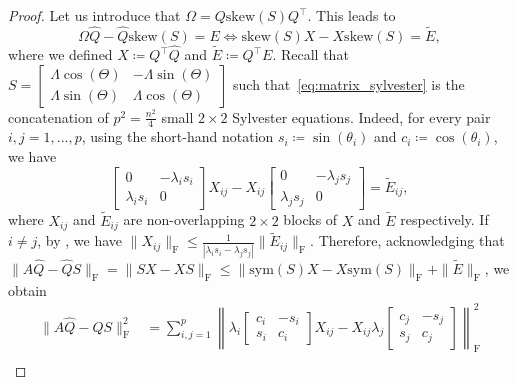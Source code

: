 \documentclass[10pt,twoside,dvipsnames]{siamart1116}
\numberwithin{algorithm}{section}
\numberwithin{equation}{section}
\begin{document}
\begin{proof}

Let us introduce that $\Omega=Q\mathrm{skew}(S)Q^\top$. This leads to
\begin{equation}\label{eq:matrix_sylvester}
	\Omega \widehat{Q} -\widehat{Q}\mathrm{skew}(S)=E\iff \mathrm{skew}(S)X - X\mathrm{skew}(S)=\widetilde{E},
\end{equation}
where we defined $X\coloneq Q^\top \widehat{Q}$ and $\widetilde{E} \coloneq Q^\top E$. Recall that $S=\left[\begin{smallmatrix}\Lambda\cos(\Theta)&-\Lambda\sin(\Theta)\\\Lambda\sin(\Theta)&\Lambda\cos(\Theta)\end{smallmatrix}\right]$ such that~\eqref{eq:matrix_sylvester} is the concatenation of $p^2=\frac{n^2}{4}$ small $2\times 2$ Sylvester equations. Indeed, for every pair $i,j=1,...,p$, using the short-hand notation $s_i\coloneq \sin(\theta_i)$ and $c_i\coloneq \cos(\theta_i)$, we have
\begin{equation}\label{eq:small_sylvester}
	\begin{bmatrix}
		0&-\lambda_i s_i\\
		\lambda_i s_i&0
	\end{bmatrix}X_{ij}-X_{ij}\begin{bmatrix}
		0&-\lambda_j s_j\\
		\lambda_j s_j&0
	\end{bmatrix}=\widetilde{E}_{ij},
\end{equation} where $X_{ij}$ and $\widetilde{E}_{ij}$ are non-overlapping $2\times2$ blocks of $X$ and $\widetilde{E}$ respectively. If $i\neq j$, by \cite[Thm.~VII.2.8]{bhatia97}, we have $\|X_{ij}\|_\mathrm{F}\leq \frac{1}{|\lambda_is_i-\lambda_js_j|}\|\widetilde{E}_{ij}\|_\mathrm{F}$. Therefore, acknowledging that $\|A\widehat{Q}-\widehat{Q}S\|_\mathrm{F}=\|SX-XS\|_\mathrm{F}\leq \|\mathrm{sym}(S)X-X\mathrm{sym}(S)\|_\mathrm{F}+\|\widetilde{E}\|_\mathrm{F}$, we obtain
\begin{align}
\nonumber
	\|A\widehat{Q}-\widehat{Q}S\|_\mathrm{F}^2&=\sum_{i,j=1}^{p} \left\|\lambda_i \begin{bmatrix}c_i&-s_i\\ s_i&c_i\end{bmatrix} X_{ij}-X_{ij}\lambda_j \begin{bmatrix}c_j&-s_j\\ s_j&c_j\end{bmatrix} \right\|_\mathrm{F}^2\\

\end{align}
\end{proof}
\end{document}
